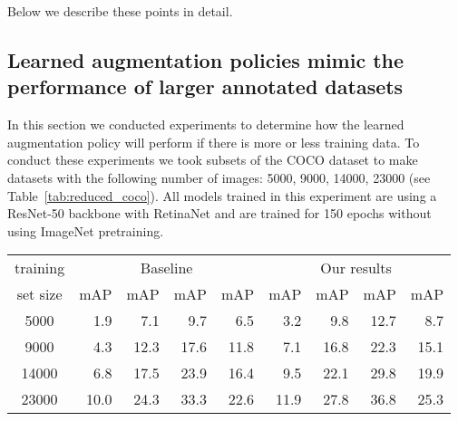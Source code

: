 \documentclass[10pt,twocolumn,letterpaper]{article}
\begin{document}
Below we describe these points in detail.  

\fi

\subsection{Learned augmentation policies mimic the performance of larger annotated datasets}

In this section we conducted experiments to determine how the learned augmentation policy will perform if there is more or less training data. To conduct these experiments we took subsets of the COCO dataset to make datasets with the following number of images: 5000, 9000, 14000, 23000 (see Table~\ref{tab:reduced_coco}). All models trained in this experiment are using a ResNet-50 backbone with RetinaNet and are trained for 150 epochs without using ImageNet pretraining.

\begin{table*}[h!]
\centering
\small
\begin{tabular}{c|rrrr|rrrr}
  \hline
  training & \multicolumn{4}{c|}{Baseline} & \multicolumn{4}{c}{Our results}  \\
   set size & mAP &  mAP &  mAP & mAP & mAP &  mAP &  mAP & mAP \\
  \hline
  5000  &1.9 &7.1& 9.7& 6.5 &3.2 &9.8&12.7& 8.7 \\
  9000 &4.3&12.3& 17.6& 11.8  &7.1 & 16.8&22.3& 15.1 \\
  14000 &6.8&17.5& 23.9& 16.4 &9.5 & 22.1&29.8& 19.9 \\
  23000 &10.0&24.3& 33.3& 22.6 & 11.9&27.8&36.8& 25.3  \\
  \hline
\end{tabular}
\caption{\textbf{Learned augmentation policy is especially beneficial for small datasets and small objects.} Mean average precision (mAP) for RetinaNet model trained on COCO with varying subsets of the original training set. mAP, mAP and mAP denote the mean average precision for small, medium and large examples. Note the complete COCO training set consists of 118K examples.The same policy found on the 5000 COCO images was used in all of the experiments. The models in the first row were trained on the same 5000 images that the policies were searched on. }
\label{tab:reduced_coco}  
\end{table*}
\end{document}
